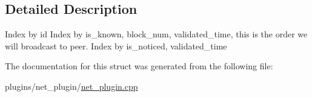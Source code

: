 \subsection{Detailed Description}
Index by id Index by is\+\_\+known, block\+\_\+num, validated\+\_\+time, this is the order we will broadcast to peer. Index by is\+\_\+noticed, validated\+\_\+time 

The documentation for this struct was generated from the following file\+:\begin{DoxyCompactItemize}
\item 
plugins/net\+\_\+plugin/\mbox{\hyperlink{net__plugin_8cpp}{net\+\_\+plugin.\+cpp}}\end{DoxyCompactItemize}
